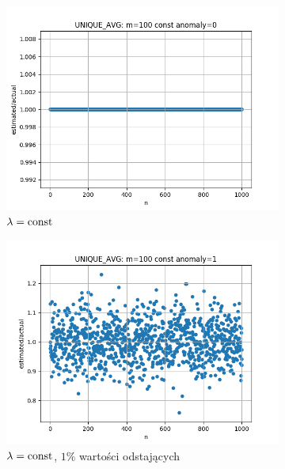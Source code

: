 \documentclass{article}
\begin{document}
    \begin{figure}[H]
        \begin{subfigure}{0.6\textwidth}
            \centering
            \includegraphics[width=\linewidth]{avg/zad1_const_0.png}
            \caption{$\lambda = \textnormal{const}$}
        \end{subfigure}
        \begin{subfigure}{0.6\textwidth}
            \centering
            \includegraphics[width=\linewidth]{avg/zad1_const_1.png}
            \caption{$\lambda = \textnormal{const}$, $1\%$ wartości odstających}
        \end{subfigure}
        \begin{subfigure}{0.6\textwidth}

\end{subfigure}
\end{figure}
\end{document}
